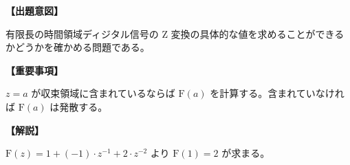 \noindent \textbf{【出題意図】}

\bigskip
\noindent 有限長の時間領域ディジタル信号の Z 変換の具体的な値を求めることができるかどうかを確かめる問題である。

\vspace{1em}
\noindent \textbf{【重要事項】}

\medskip
$z = a$ が収束領域に含まれているならば $\textrm{F}(a)$ を計算する。含まれていなければ $\textrm{F}(a)$ は発散する。

\bigskip

\vspace{1em}
\noindent \textbf{【解説】}

\bigskip
\noindent $\textrm{F}(z) = 1 + (-1) \cdot z^{-1} + 2 \cdot z^{-2}$ より $\textrm{F}(1) = 2$ が求まる。

